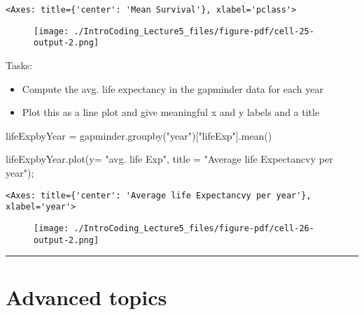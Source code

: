 \documentclass[
  letterpaper,
  DIV=11,
  numbers=noendperiod]{scrreprt}
\newenvironment{Shaded}{\begin{snugshade}}{\end{snugshade}}
\newcommand{\NormalTok}[1]{\textcolor[rgb]{0.00,0.23,0.31}{#1}}
\newcommand{\OperatorTok}[1]{\textcolor[rgb]{0.37,0.37,0.37}{#1}}
\newcommand{\StringTok}[1]{\textcolor[rgb]{0.13,0.47,0.30}{#1}}
\providecommand{\tightlist}{%
  \setlength{\itemsep}{0pt}\setlength{\parskip}{0pt}}\usepackage{longtable,booktabs,array}
\begin{document}
\begin{verbatim}
<Axes: title={'center': 'Mean Survival'}, xlabel='pclass'>
\end{verbatim}

\begin{figure}[H]

{\centering \texttt{[image: ./IntroCoding\_Lecture5\_files/figure-pdf/cell-25-output-2.png]}

}

\end{figure}

Tasks:

\begin{itemize}
\tightlist
\item
  Compute the avg. life expectancy in the gapminder data for each year
\item
  Plot this as a line plot and give meaningful x and y labels and a
  title
\end{itemize}

\begin{Shaded}
\begin{Highlighting}[]
\NormalTok{lifeExpbyYear }\OperatorTok{=}\NormalTok{ gapminder.groupby(}\StringTok{"year"}\NormalTok{)[}\StringTok{"lifeExp"}\NormalTok{].mean()}

\NormalTok{lifeExpbyYear.plot(y}\OperatorTok{=} \StringTok{"avg. life Exp"}\NormalTok{, title }\OperatorTok{=} \StringTok{"Average life Expectancvy per year"}\NormalTok{)}\OperatorTok{;}
\end{Highlighting}
\end{Shaded}

\begin{verbatim}
<Axes: title={'center': 'Average life Expectancvy per year'}, xlabel='year'>
\end{verbatim}

\begin{figure}[H]

{\centering \texttt{[image: ./IntroCoding\_Lecture5\_files/figure-pdf/cell-26-output-2.png]}

}

\end{figure}

\begin{center}\rule{0.5\linewidth}{0.5pt}\end{center}

\hypertarget{advanced-topics}{%
\section{Advanced topics}\label{advanced-topics}}
\end{document}
